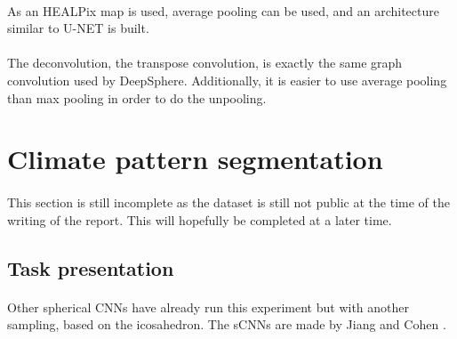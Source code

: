 \documentclass[11pt]{report}
\begin{document}
\paragraph*{}
As an HEALPix map is used, average pooling can be used, and an architecture similar to U-NET\cite{ronneberger_u-net:_2015} is built.

\paragraph*{}
The deconvolution, the transpose convolution, is exactly the same graph convolution used by DeepSphere. Additionally, it is easier to use average pooling than max pooling in order to do the unpooling.


\section{Climate pattern segmentation}\label{task:climate}
\paragraph*{}
This section is still incomplete as the dataset is still not public at the time of the writing of the report. This will hopefully be completed at a later time.

\subsection{Task presentation}
\paragraph*{}
Other spherical CNNs have already run this experiment but with another sampling, based on the icosahedron. The sCNNs are made by Jiang \cite{jiang_spherical_2019} and Cohen \cite{cohen_gauge_2019}. 
\end{document}
